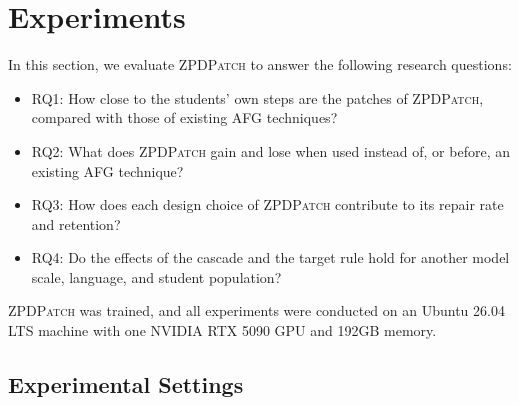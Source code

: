 \documentclass[conference]{IEEEtran}
\begin{document}
\section{Experiments}
\label{sec:experiment}
In this section, we evaluate \textsc{ZPDPatch} to answer the following research questions:
\begin{itemize}
\item RQ1: How close to the students' own steps are the patches of \textsc{ZPDPatch}, compared with those of existing AFG techniques?
\item RQ2: What does \textsc{ZPDPatch} gain and lose when used instead of, or before, an existing AFG technique?
\item RQ3: How does each design choice of \textsc{ZPDPatch} contribute to its repair rate and retention?
\item RQ4: Do the effects of the cascade and the target rule hold for another model scale, language, and student population?
\end{itemize}
\textsc{ZPDPatch} was trained, and all experiments were conducted on an Ubuntu 26.04 LTS machine with one NVIDIA RTX 5090 GPU and 192GB memory.

\subsection{Experimental Settings}
\label{sec:settings}
\end{document}
